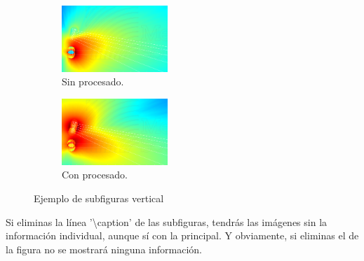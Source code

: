 \begin{figure}[h]
    \centering
    \begin{subfigure}[b]{\textwidth}
    	\centering
        \includegraphics[width=4cm]{archivos/subs-sin}
        \caption{Sin procesado.}
        \label{fig:gull2}
    \end{subfigure}
    
    \begin{subfigure}[b]{\textwidth}
    	\centering
        \includegraphics[width=4cm]{archivos/subs-con}
        \caption{Con procesado.}
        \label{fig:tiger2}
    \end{subfigure}
    \caption{Ejemplo de subfiguras vertical}\label{sistemass2}
\end{figure}

Si eliminas la línea '\textbackslash caption' de las subfiguras, tendrás las imágenes sin la información individual, aunque sí con la principal. Y obviamente, si eliminas el de la figura no se mostrará ninguna información.


